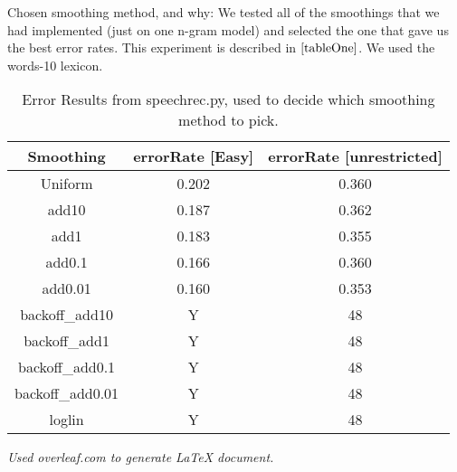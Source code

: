 \documentclass[12pt, letterpaper]{article}
\begin{document}
Chosen smoothing method, and why: We tested all of the smoothings that we had implemented (just on one n-gram model) and selected the one that gave us the best error rates. This experiment is described in $\ref{tableOne}$. We used the words-10 lexicon.

\begin{table}
\begin{center}
\begin{tabular}{|c|c|c|}
\hline
Smoothing & errorRate [Easy] & errorRate [unrestricted]\\
\hline \hline
Uniform & 0.202 & 0.360\\
\hline 
add10 & 0.187 & 0.362\\
\hline 
add1 & 0.183 & 0.355\\
\hline 
add0.1 & 0.166 & 0.360\\
\hline 
add0.01 & 0.160 & 0.353\\
\hline 
backoff\_add10 & Y & 48\\
\hline 
backoff\_add1 & Y & 48\\
\hline 
backoff\_add0.1 & Y & 48\\
\hline 
backoff\_add0.01 & Y & 48\\
\hline 
loglin & Y & 48\\
\hline
\end{tabular}
\end{center}
\caption{Error Results from speechrec.py, used to decide which smoothing method to pick.}
\label{tableOne}
\end{table}

\begin{center}
\textit{Used overleaf.com to generate LaTeX document.}
\end{center}
\end{document}
